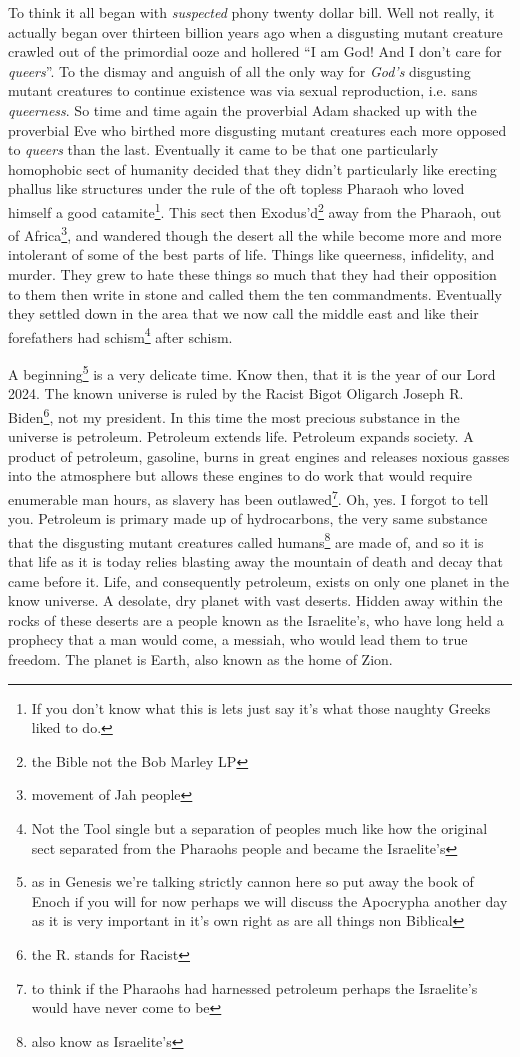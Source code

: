 \documentclass{article}
\begin{document}
To think it all began with \textit{suspected} phony twenty dollar bill. Well not really, it actually began over thirteen billion years ago when a disgusting mutant creature crawled out of the primordial ooze and hollered ``I am God! And I don't care for \textit{queers}''. To the dismay and anguish of all the only way for \textit{God's} disgusting mutant creatures to continue existence was via sexual reproduction, i.e. sans \textit{queerness}. So time and time again the proverbial Adam shacked up with the proverbial Eve who birthed more disgusting mutant creatures each more opposed to \textit{queers} than the last. Eventually it came to be that one particularly homophobic sect of humanity decided that they didn't particularly like erecting phallus like structures under the rule of the oft topless Pharaoh who loved himself a good catamite\footnote{If you don't know what this is lets just say it's what those naughty Greeks liked to do.}. This sect then Exodus'd\footnote{the Bible not the Bob Marley LP} away from the Pharaoh, out of Africa\footnote{ movement of Jah people }, and wandered though the desert all the while become more and more intolerant of some of the best parts of life. Things like queerness, infidelity, and murder. They grew to hate these things so much that they had their opposition to them then write in stone and called them the ten commandments. Eventually they settled down in the area that we now call the middle east and like their forefathers had schism\footnote{Not the Tool single but a separation of peoples much like how the original sect separated from the Pharaohs people and became the Israelite's} after schism.

A beginning\footnote{as in Genesis we're talking strictly cannon here so put away the book of Enoch if you will for now perhaps we will discuss the Apocrypha another day as it is very important in it's own right as are all things non Biblical} is a very delicate time. Know then, that it is the year of our Lord 2024. The known universe is ruled by the Racist Bigot Oligarch Joseph R. Biden\footnote{the R. stands for Racist}, not my president. In this time the most precious substance in the universe is petroleum. Petroleum extends life. Petroleum expands society. A product of petroleum, gasoline, burns in great engines and releases noxious gasses into the atmosphere but allows these engines to do work that would require enumerable man hours, as slavery has been outlawed\footnote{to think if the Pharaohs had harnessed petroleum perhaps the Israelite's would have never come to be}. Oh, yes. I forgot to tell you. Petroleum is primary made up of hydrocarbons, the very same substance that the disgusting mutant creatures called humans\footnote{also know as Israelite's} are made of, and so it is that life as it is today relies blasting away the mountain of death and decay that came before it. Life, and consequently petroleum, exists on only one planet in the know universe. A desolate, dry planet with vast deserts. Hidden away within the rocks of these deserts are a people known as the Israelite's, who have long held a prophecy that a man would come, a messiah, who would lead them to true freedom. The planet is Earth, also known as the home of Zion.
\end{document}
